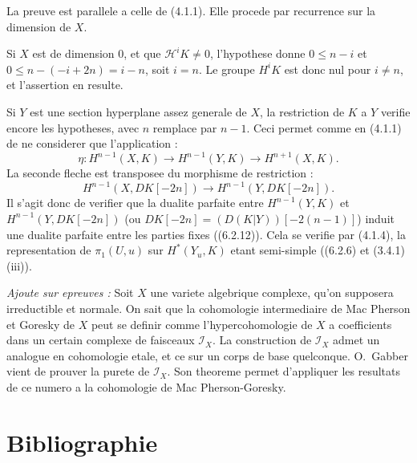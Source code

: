 \documentclass[12pt,a4paper]{article}
\theoremstyle{plain}
\theoremstyle{definition}
\theoremstyle{remark}
\newcommand{\scrH}{\mathscr{H}}
\newcommand{\scrI}{\mathscr{I}}
\begin{document}
La preuve est parallele a celle de (4.1.1). Elle procede par recurrence sur la dimension de $X$.

Si $X$ est de dimension $0$, et que $\scrH^i K \neq 0$, l'hypothese donne $0 \leq n - i$ et $0 \leq n - (-i + 2n) = i - n$, soit $i = n$. Le groupe $H^i K$ est donc nul pour $i \neq n$, et l'assertion en resulte.

Si $Y$ est une section hyperplane assez generale de $X$, la restriction de $K$ a $Y$ verifie encore les hypotheses, avec $n$ remplace par $n-1$. Ceci permet comme en (4.1.1) de ne considerer que l'application :
\[
\eta : H^{n-1}(X, K) \to H^{n-1}(Y, K) \to H^{n+1}(X, K).
\]
La seconde fleche est transposee du morphisme de restriction :
\[
H^{n-1}(X, DK[-2n]) \to H^{n-1}(Y, DK[-2n]).
\]
Il s'agit donc de verifier que la dualite parfaite entre $H^{n-1}(Y, K)$ et $H^{n-1}(Y, DK[-2n])$ (ou $DK[-2n] = (D(K|Y))[-2(n-1)]$) induit une dualite parfaite entre les parties fixes ((6.2.12)). Cela se verifie par (4.1.4), la representation de $\pi_1(U, u)$ sur $H^*(Y_u, K)$ etant semi-simple ((6.2.6) et (3.4.1) (iii)).

\vspace{0.5cm}
\noindent\textit{Ajoute sur epreuves :} Soit $X$ une variete algebrique complexe, qu'on supposera irreductible et normale. On sait que la cohomologie intermediaire de Mac Pherson et Goresky de $X$ peut se definir comme l'hypercohomologie de $X$ a coefficients dans un certain complexe de faisceaux $\scrI_X$. La construction de $\scrI_X$ admet un analogue en cohomologie etale, et ce sur un corps de base quelconque. O.~Gabber vient de prouver la purete de $\scrI_X$. Son theoreme permet d'appliquer les resultats de ce numero a la cohomologie de Mac Pherson-Goresky.


\section*{Bibliographie}
\end{document}
